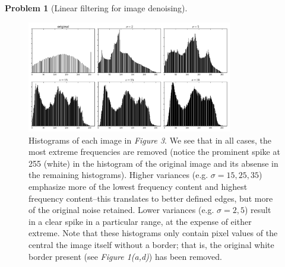 \documentclass[10pt]{article}
\theoremstyle{plain}
\theoremstyle{definition}
\newtheorem{prob}{Problem}
\numberwithin{equation}{section}
\begin{document}
\begin{prob}[Linear filtering for image denoising]
\begin{figure}[p]
    \begin{center}
        \includegraphics[width=0.8\textwidth]{varspread-hists}
        \caption{
            Histograms of each image in \textit{Figure 3}. We see that in all cases, the most
            extreme frequencies are removed (notice the prominent spike at 255 (white) in the histogram
            of the original image and its absense in the remaining histograms). Higher variances
            (e.g. $\sigma=15,25,35$) emphasize more of the lowest frequency content
            and highest frequency content--this translates to better defined edges, but more of the
            original noise retained. Lower variances (e.g. $\sigma=2,5$) result in a clear spike in a
            particular range, at the expense of either extreme. Note that
            these histograms only contain
            pixel values of the central the image itself without a border; that is, the original white border present
            (see \textit{Figure 1(a,d)}) has been removed.
        }
    \end{center}
\end{figure}

\end{prob}
\end{document}
